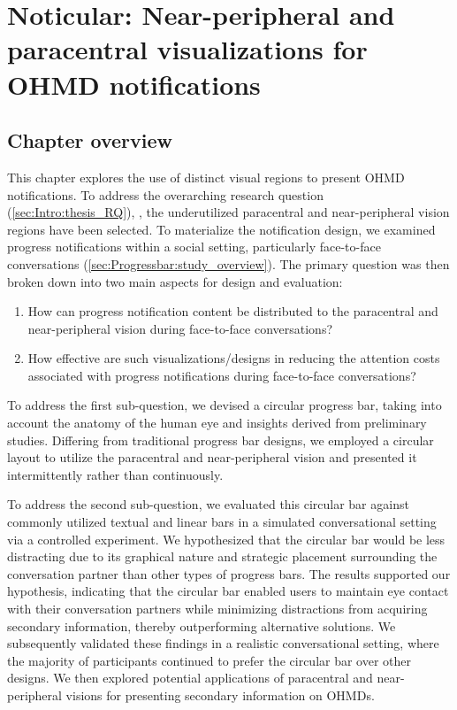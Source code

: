 
\chapter{Noticular: Near-peripheral and paracentral visualizations for OHMD notifications}
\label{ch:Progressbar}




\section{Chapter overview}


This chapter explores the use of distinct visual regions to present OHMD notifications. To address the overarching research question (\autoref{sec:Intro:thesis_RQ}), \RQMainProgressBar{}, the underutilized paracentral and near-peripheral vision regions have been selected. To materialize the notification design, we examined progress notifications within a social setting, particularly face-to-face conversations (\autoref{sec:Progressbar:study_overview}). The primary question was then broken down into two main aspects for design and evaluation:
\begin{enumerate}
    \item How can progress notification content be distributed to the paracentral and near-peripheral vision during face-to-face conversations?
    \item How effective are such visualizations/designs in reducing the attention costs associated with progress notifications during face-to-face conversations?
\end{enumerate}


To address the first sub-question, we devised a circular progress bar, taking into account the anatomy of the human eye and insights derived from preliminary studies. Differing from traditional progress bar designs, we employed a circular layout to utilize the paracentral and near-peripheral vision and presented it intermittently rather than continuously.

To address the second sub-question, we evaluated this circular bar against commonly utilized textual and linear bars in a simulated conversational setting via a controlled experiment. We hypothesized that the circular bar would be less distracting due to its graphical nature and strategic placement surrounding the conversation partner than other types of progress bars. The results supported our hypothesis, indicating that the circular bar enabled users to maintain eye contact with their conversation partners while minimizing distractions from acquiring secondary information, thereby outperforming alternative solutions. We subsequently validated these findings in a realistic conversational setting, where the majority of participants continued to prefer the circular bar over other designs. We then explored potential applications of paracentral and near-peripheral visions for presenting secondary information on OHMDs. 

